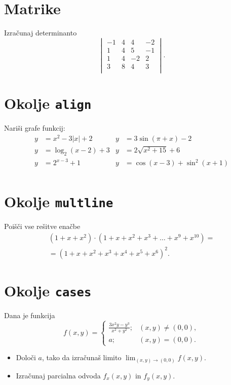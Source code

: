 \documentclass[a4paper,12pt]{article}
\begin{document}
\section*{Matrike}
Izračunaj determinanto
\[
\begin{vmatrix}
    -1 & 4 & 4 & -2 \\
    1 & 4 & 5 & -1 \\
    1 & 4 & -2 & 2 \\
    3 & 8 & 4 & 3 \\
\end{vmatrix}.
\]

\section*{Okolje \texttt{align}}
Nariši grafe funkcij:
\begin{align*}
y & = x^2 - 3|x| + 2   & y & = 3 \sin(\pi+x) - 2 \\
y & = \log_2(x-2) + 3  & y & = 2 \sqrt{x^2+15} + 6 \\
y & = 2^{x-3} + 1      & y & = \cos(x-3) + \sin^2(x+1) \\
\end{align*}

\section*{Okolje \texttt{multline}}

Poišči vse rešitve enačbe
\begin{multline*}
(1+x+x^2) \cdot (1+x+x^2+x^3+\ldots+x^9+x^{10}) = \\
=(1+x+x^2+x^3+x^4+x^5+x^6)^2.  
\end{multline*}


\section*{Okolje \texttt{cases}}

Dana je funkcija
\[
f(x, y) = \begin{cases}
   \frac{3x^2y-y^3}{x^2+y^2}; & (x, y) \neq (0, 0),  \\
   a; & (x, y) = (0, 0).
\end{cases}
\]

\begin{itemize}
\item Določi \(a\), tako da izračunaš limito \( \lim_{(x,y)\to(0,0)} f(x,y) \).
\item Izračunaj parcialna odvoda \(f_x(x,y)\) in \(f_y(x,y)\).
\end{itemize}
\end{document}
